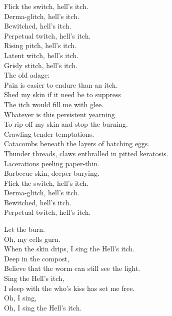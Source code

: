 Flick the switch, hell's itch. \\
Derma-glitch, hell's itch. \\
Bewitched, hell's itch. \\
Perpetual twitch, hell's itch. \\
Rising pitch, hell's itch. \\
Latent witch, hell's itch. \\
Grisly stitch, hell's itch. \\

The old adage: \\
Pain is easier to endure than an itch. \\

Shed my skin if it need be to suppress \\
The itch would fill me with glee. \\
Whatever is this persistent yearning \\
To rip off my skin and stop the burning. \\
Crawling tender temptations. \\

Catacombs beneath the layers of hatching eggs. \\
Thunder threads, claws enthralled in pitted keratosis. \\
Lacerations peeling paper-thin. \\
Barbecue skin, deeper burying. \\

Flick the switch, hell's itch. \\
Derma-glitch, hell's itch. \\
Bewitched, hell's itch. \\
Perpetual twitch, hell's itch. \\


Let the  burn. \\
Oh, my cells gurn. \\
When the skin drips, I sing the Hell's itch. \\
Deep in the compost, \\
Believe that the worm can still see the light. \\
Sing the Hell's itch, \\
I sleep with the  who's kiss has set me free. \\
Oh, I sing, \\
Oh, I sing the Hell's itch. \\

